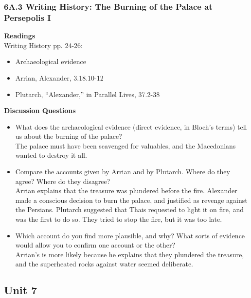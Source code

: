 \documentclass{article}
\begin{document}
\subsubsection*{6A.3 Writing History: The Burning of the Palace at Persepolis I}
\textbf{Readings} \\
Writing History pp. 24-26:
\begin{itemize}
  \item Archaeological evidence
  \item Arrian, Alexander, 3.18.10-12
  \item Plutarch, “Alexander,” in Parallel Lives, 37.2-38
\end{itemize}
\textbf{Discussion Questions}
\begin{itemize}
  \item What does the archaeological evidence (direct evidence, in Bloch’s terms) tell us
  about the burning of the palace? \\
  The palace must have been scavenged for valuables, and the Macedonians wanted to
  destroy it all.
  \item Compare the accounts given by Arrian and by Plutarch.  Where do they agree?
  Where do they disagree? \\
  Arrian explains that the treasure was plundered before the fire. Alexander made a conscious
  decision to burn the palace, and justified as revenge against the Persians. Plutarch
  suggested that Thais requested to light it on fire, and was the first to do so. They tried to
  stop the fire, but it was too late.
  \item Which account do you find more plausible, and why? What sorts of evidence would
  allow you to confirm one account or the other? \\
  Arrian's is more likely because he explains that they plundered the treasure, and the
  superheated rocks against water seemed deliberate.
\end{itemize}
\subsection*{Unit 7}
\end{document}
